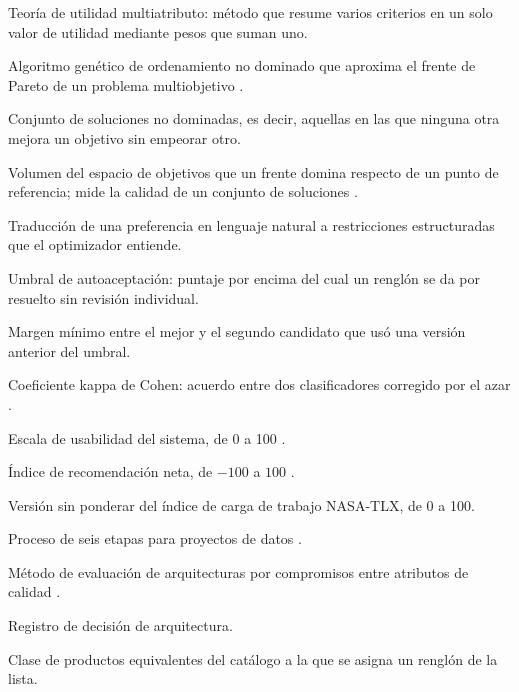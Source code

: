 \begin{description}[leftmargin=2.5cm,style=nextline]
\item[MAUT] Teoría de utilidad multiatributo: método que resume varios criterios en un solo valor de utilidad mediante pesos que suman uno.
\item[NSGA-II] Algoritmo genético de ordenamiento no dominado que aproxima el frente de Pareto de un problema multiobjetivo \citep{deb_fast_2002}.
\item[Frente de Pareto] Conjunto de soluciones no dominadas, es decir, aquellas en las que ninguna otra mejora un objetivo sin empeorar otro.
\item[Hipervolumen] Volumen del espacio de objetivos que un frente domina respecto de un punto de referencia; mide la calidad de un conjunto de soluciones \citep{zitzler_multiobjective_1999}.
\item[NL2C] Traducción de una preferencia en lenguaje natural a restricciones estructuradas que el optimizador entiende.
\item[$\tau$] Umbral de autoaceptación: puntaje por encima del cual un renglón se da por resuelto sin revisión individual.
\item[$\delta$] Margen mínimo entre el mejor y el segundo candidato que usó una versión anterior del umbral.
\item[$\kappa$] Coeficiente kappa de Cohen: acuerdo entre dos clasificadores corregido por el azar \citep{cohen_coefficient_1960}.
\item[SUS] Escala de usabilidad del sistema, de 0 a 100 \citep{brooke_sus_1996}.
\item[NPS] Índice de recomendación neta, de $-100$ a $100$ \citep{reichheld_one_2003}.
\item[RTLX] Versión sin ponderar del índice de carga de trabajo NASA-TLX, de 0 a 100.
\item[CRISP-DM] Proceso de seis etapas para proyectos de datos \citep{chapman_crisp-dm_2000,wirth_crisp-dm_2000}.
\item[ATAM] Método de evaluación de arquitecturas por compromisos entre atributos de calidad \citep{bass_software_2021}.
\item[ADR] Registro de decisión de arquitectura.
\item[Concepto canónico] Clase de productos equivalentes del catálogo a la que se asigna un renglón de la lista.
\end{description}




